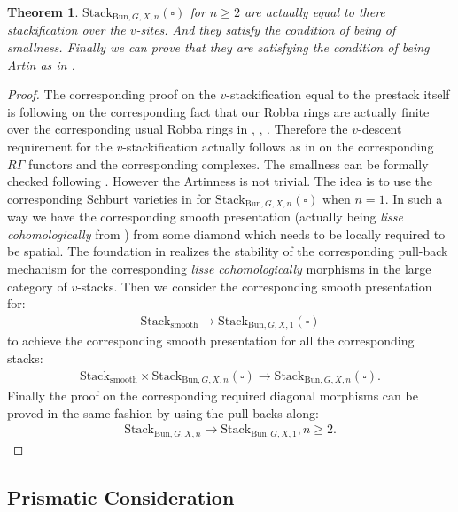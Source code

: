 \documentclass[12pt]{article}
\newtheorem{theorem}{Theorem}
\theoremstyle{definition}
\begin{document}
\begin{theorem}
$\mathrm{Stack}_{\mathrm{Bun},G,X,n}(\square)$ for $n\geq 2$ are actually equal to there stackification over the $v$-sites. And they satisfy the condition of being of smallness. Finally we can prove that they are satisfying the condition of being Artin as in \cite{FS}.
\end{theorem}

\begin{proof}
The corresponding proof on the $v$-stackification equal to the prestack itself is following on the corresponding fact that our Robba rings are actually finite over the corresponding usual Robba rings in \cite{FS}, \cite{KLA}, \cite{KLB}. Therefore the $v$-descent requirement for the $v$-stackification actually follows as in \cite{FS} on the corresponding $R\Gamma$ functors and the corresponding complexes. The smallness can be formally checked following \cite[See the corresponding 1.3 of Chapter III, the Proposition]{FS}. However the Artinness is not trivial. The idea is to use the corresponding Schburt varieties in \cite{FS} for $\mathrm{Stack}_{\mathrm{Bun},G,X,n}(\square)$ when $n=1$. In such a way we have the corresponding smooth presentation (actually being \textit{lisse cohomologically} from \cite{SchC}) from some diamond which needs to be locally required to be spatial. The foundation in \cite{SchC} realizes the stability of the corresponding pull-back mechanism for the corresponding \textit{lisse cohomologically} morphisms in the large category of $v$-stacks. Then we consider the corresponding smooth presentation for:
\begin{align}
\mathrm{Stack}_\mathrm{smooth} \longrightarrow \mathrm{Stack}_{\mathrm{Bun},G,X,1}(\square)
\end{align}
to achieve the corresponding smooth presentation for all the corresponding stacks:
\begin{align}
\mathrm{Stack}_{\mathrm{smooth}}\times \mathrm{Stack}_{\mathrm{Bun},G,X,n}(\square)  \longrightarrow \mathrm{Stack}_{\mathrm{Bun},G,X,n}(\square).
\end{align}
Finally the proof on the corresponding required diagonal morphisms can be proved in the same fashion by using the pull-backs along:
\begin{align}
\mathrm{Stack}_{\mathrm{Bun},G,X,n}\longrightarrow \mathrm{Stack}_{\mathrm{Bun},G,X,1},n\geq 2.
\end{align}
\end{proof}

\subsection{Prismatic Consideration}
\end{document}

